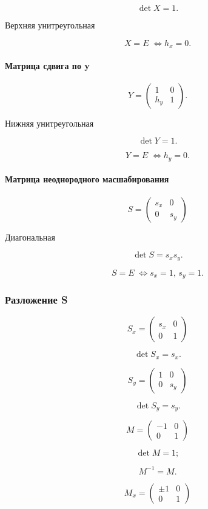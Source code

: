 $$\det X = 1.$$

Верхняя унитреугольная

$$X = E\; \Leftrightarrow h_x = 0.$$


\paragraph{Матрица сдвига по y}
$$
Y = \begin{pmatrix}
	1 & 0 \\
	h_y & 1
\end{pmatrix}.
$$

Нижняя унитреугольная

$$\det Y = 1.$$

$$Y = E\; \Leftrightarrow h_y = 0.$$


\paragraph{Матрица неоднородного масшабирования}
$$S=
\begin{pmatrix}
	s_x & 0 \\
	0 & s_y
\end{pmatrix}
$$

Диагональная

$$\det S = s_x s_y.$$

$$S = E\; \Leftrightarrow s_x = 1,\,s_y=1.$$

\subsubsection{Разложение S}

$$S_x = \begin{pmatrix}
	s_x & 0 \\
	0 & 1
\end{pmatrix}$$

$$\det S_x = s_x.$$

$$S_y = \begin{pmatrix}
	1 & 0 \\
	0 & s_y
\end{pmatrix}$$

$$\det S_y = s_y.$$

$$M = \begin{pmatrix}
	-1 & 0 \\
	0 & 1
\end{pmatrix}$$

$$\det M = 1;$$

$$M^{-1} = M.$$

$$M_x = \begin{pmatrix}
	\pm 1 & 0 \\
	0 & 1
\end{pmatrix}$$

